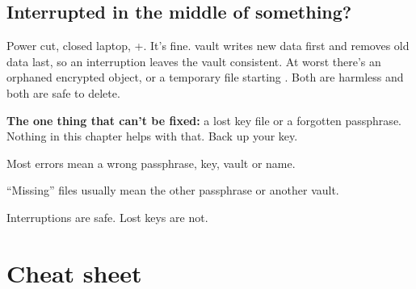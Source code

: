 \documentclass[10pt,oneside,openany]{book}
\begin{document}
\section{Interrupted in the middle of something?}

Power cut, closed laptop, +. It's fine. vault writes
new data first and removes old data last, so an interruption leaves the vault
consistent. At worst there's an orphaned encrypted object, or a temporary
file starting . Both are harmless and both are safe to delete.

\begin{danger}
\textbf{The one thing that can't be fixed:} a lost key file or a forgotten
passphrase. Nothing in this chapter helps with that. Back up your key.
\end{danger}

\begin{pocket}
\begin{pocketlist}
  \item Most errors mean a wrong passphrase, key, vault or name.
  \item ``Missing'' files usually mean the other passphrase or another vault.
  \item Interruptions are safe. Lost keys are not.
\end{pocketlist}
\end{pocket}

\chapter{Cheat sheet}
\end{document}
